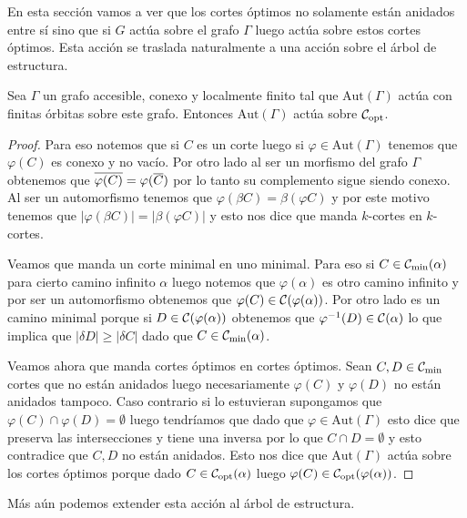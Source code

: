 \documentclass[tesis.tex]{subfiles}
\newcommand{\aut}{\text{Aut}}
\begin{document}
En esta sección vamos a ver que los cortes óptimos no solamente están anidados entre sí sino que si $G$ actúa sobre el grafo $\Gamma$ luego actúa sobre estos cortes óptimos.
Esta acción se traslada naturalmente a una acción sobre el árbol de estructura.



\begin{prop}
	Sea $\Gamma$ un grafo accesible, conexo y localmente finito tal que $\aut(\Gamma)$ actúa con finitas órbitas sobre este grafo.
	Entonces $\aut(\Gamma)$ actúa sobre ${\cal C}_{\text{opt}}$.
\end{prop}

\begin{proof}
	Para eso notemos que si $C$ es un corte luego si $\varphi \in \aut(\Gamma)$ tenemos que $\varphi(C)$ es conexo y no vacío. 
	Por otro lado al ser un morfismo del grafo $\Gamma$ obtenemos que $\overline{\varphi(C)} = \varphi(\overline C)$ por lo tanto su complemento sigue siendo conexo.
	Al ser un automorfismo tenemos que $\varphi(\beta C) = \beta (\varphi C)$ y por este motivo tenemos que $|\varphi (\beta C)| = |\beta (\varphi C)|$ y esto nos dice que manda $k$-cortes en $k$-cortes.
	
	
	Veamos que manda un corte minimal en uno minimal. 
	Para eso si $C \in {{\cal C}}_{\text{min}}(\alpha)$ para cierto camino infinito $\alpha$ luego notemos que $\varphi(\alpha)$ es otro camino infinito y por ser un automorfismo obtenemos que $\varphi(C) \in {\cal C}({\varphi(\alpha)})$.
	Por otro lado es un camino minimal porque si $D \in {\cal C}(\varphi(\alpha))$ obtenemos que $\varphi^{-1}(D) \in {\cal C}(\alpha)$ lo que implica que $|\delta D| \ge |\delta C|$ dado que $C \in {\cal C}_{\text{min}}(\alpha)$.
	
	Veamos ahora que manda cortes óptimos en cortes óptimos.
	Sean $C,D \in {\cal C}_{\text{min}}$ cortes que no están anidados luego necesariamente $\varphi(C)$ y $\varphi(D)$ no están anidados tampoco.
	Caso contrario si lo estuvieran supongamos que $\varphi(C) \cap \varphi(D) = \emptyset$ luego tendríamos que dado que $\varphi \in \aut(\Gamma)$ esto dice que preserva las intersecciones y tiene una inversa por lo que $C \cap D = \emptyset$ y esto contradice que $C, D$ no están anidados.
	Esto nos dice que $\aut(\Gamma)$ actúa sobre los cortes óptimos porque dado $C \in {\cal C}_{\text{opt}}(\alpha)$ luego $\varphi(C) \in {\cal C}_{\text{opt}}(\varphi(\alpha))$.
	
\end{proof}

Más aún podemos extender esta acción al árbol de estructura.
\end{document}
